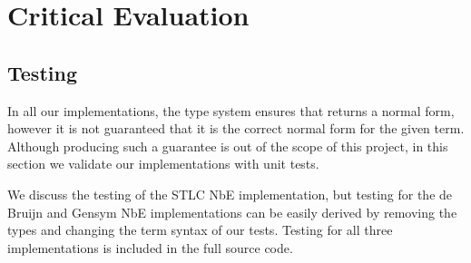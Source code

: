 \chapter{Critical Evaluation}
\label{chap:evaluation}

% 
% 

\section{Testing}
\label{section:testing}

In all our implementations, the type system ensures that  returns a normal form, however it is not guaranteed that it is the correct normal form for the given term. Although producing such a guarantee is out of the scope of this project, in this section we validate our implementations with unit tests.

We discuss the testing of the STLC NbE implementation, but testing for the de Bruijn and Gensym NbE implementations can be easily derived by removing the types and changing the term syntax of our tests. Testing for all three implementations is included in the full source code. 

